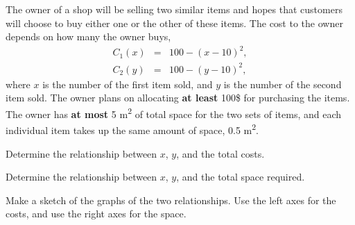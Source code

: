 \begin{problem}
\clearpage

\item The owner of a shop will be selling two similar items and hopes
  that customers will choose to buy either one or the other of these
  items. The cost to the owner depends on how many the owner buys,
  \begin{eqnarray*}
    C_1(x) & = & 100 - (x-10)^2, \\
    C_2(y) & = & 100 - (y-10)^2,
  \end{eqnarray*}
  where $x$ is the number of the first item sold, and $y$ is the
  number of the second item sold. The owner plans on allocating
  \textbf{at least} 100\$ for purchasing the items.  The owner has
  \textbf{at most} 5 m\textsuperscript{2} of total space for the two
  sets of items, and each individual item takes up the same amount of
  space, 0.5 m\textsuperscript{2}.

  \begin{subproblem}
    
  \item Determine the relationship between $x$, $y$, and the total
    costs.

    \vfill

  \item Determine the relationship between $x$, $y$, and the total
    space required.

    \vfill

  \item Make a sketch of the graphs of the two relationships. Use the
    left axes for the costs, and use the right axes for the space.


\end{subproblem}
\end{problem}
